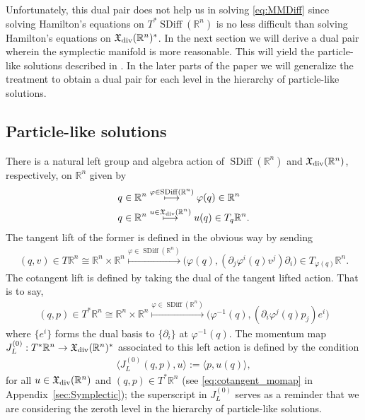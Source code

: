 \documentclass[12pt]{amsart}
\newcommand{\R}{\ensuremath{\mathbb{R}}}
\DeclareMathOperator{\SDiff}{SDiff}
\begin{document}
Unfortunately, this dual pair does not help us in solving \eqref{eq:MMDiff}
since solving Hamilton's equations on $T^*\SDiff(\R^n)$ is no less difficult
than solving Hamilton's equations on $\mathfrak{X}_{\rm div}(\R^n)^*$.
In the next section we will derive a dual pair wherein the symplectic
manifold is more reasonable.
This will yield the particle-like solutions described in \cite{MumfordMichor2013}. In the later parts of the paper we will generalize the treatment to obtain a  dual pair for each level in the hierarchy of particle-like solutions.

\subsection{Particle-like solutions}
\label{sec:zeroth_order}
There is a natural left group and algebra action of $\SDiff(\R^n)$
and $\mathfrak{X}_{\rm div}(\R^n)$, respectively, on $\R^n$ given by
\begin{align*}
  q \in \R^n
  &\stackrel{ \varphi \in \SDiff(\R^n) }{\longmapsto}
  \varphi(q) \in \R^n \\
  q \in \R^n
  &\stackrel{ u \in \mathfrak{X}_{\rm div}(\R^n) }{\longmapsto}
  u(q) \in T_q\R^n.
\end{align*}
The tangent lift of the former is defined in the obvious way by sending
\begin{align*}
  (q,v) \in T\R^n \cong \R^n \times \R^n
  \stackrel{ \varphi \in \SDiff(\R^n) }{\longmapsto}
  \big(\varphi(q) , (\partial_j\varphi^i(q) v^j) \partial_i \big) \in T_{\varphi(q)} \R^n.
\end{align*}
The cotangent lift is defined by taking the dual
of  the tangent lifted action.
That is to say,
\begin{align*}
  (q, p) \in T^*\R^n \cong \R^n \times \R^n
  \stackrel{ \varphi \in \SDiff(\R^n) }{\longmapsto}
  \big(\varphi^{-1}(q) , (\partial_i\varphi^j(q) p_j) e^i \big)
\end{align*}
where $\{e^i\}$ forms the dual basis to $\{\partial_i\}$ at $\varphi^{-1}(q)$.
The momentum map
$J^{(0)}_L : T^*\R^n \to \mathfrak{X}_{\rm div}(\R^n)^*$
associated to this left action is defined by the
condition
\begin{align*}
  \langle J_L^{(0)}( q , p) , u \rangle := \langle p , u(q) \rangle,
\end{align*}
for all $u \in \mathfrak{X}_{\rm div}(\R^n)$ and $(q,p) \in T^*\R^n$ (see \eqref{eq:cotangent_momap} in Appendix~\ref{sec:Symplectic}); the superscript in $J_L^{(0)}$ serves as a reminder that we are considering the zeroth level in the hierarchy of particle-like solutions.
\end{document}
